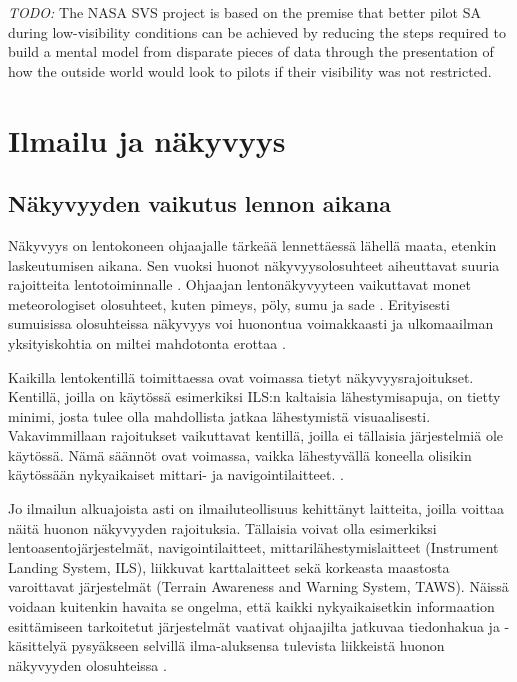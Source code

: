 \documentclass[utf8,bachelor,manualbib]{gradu3}
\begin{document}
\emph{TODO:}
The NASA SVS project is based on the premise that better pilot SA during
low-visibility conditions can be achieved by reducing the steps required to build a
mental model from disparate pieces of data through the presentation of how the
outside world would look to pilots if their visibility was not restricted. \citep{prinzel2004}

\chapter{Ilmailu ja näkyvyys}

\section{Näkyvyyden vaikutus lennon aikana}

Näkyvyys on lentokoneen ohjaajalle tärkeää lennettäessä lähellä maata, etenkin laskeutumisen aikana. Sen vuoksi huonot näkyvyysolosuhteet aiheuttavat suuria rajoitteita lentotoiminnalle \citep{mollersachs1994}. Ohjaajan lentonäkyvyyteen vaikuttavat monet meteorologiset olosuhteet, kuten pimeys, pöly, sumu ja sade \citep{wickens2009}. Erityisesti sumuisissa olosuhteissa näkyvyys voi huonontua voimakkaasti ja ulkomaailman yksityiskohtia on miltei mahdotonta erottaa \citep{beiergemperlein2004}.

Kaikilla lentokentillä toimittaessa ovat voimassa tietyt näkyvyysrajoitukset. Kentillä, joilla on käytössä esimerkiksi ILS:n kaltaisia lähestymisapuja, on tietty minimi, josta tulee olla mahdollista jatkaa lähestymistä visuaalisesti. Vakavimmillaan rajoitukset vaikuttavat kentillä, joilla ei tällaisia järjestelmiä ole käytössä. Nämä säännöt ovat voimassa, vaikka lähestyvällä koneella olisikin käytössään nykyaikaiset mittari- ja navigointilaitteet. \cite{mollersachs1994}.

Jo ilmailun alkuajoista asti on ilmailuteollisuus kehittänyt laitteita, joilla voittaa näitä huonon näkyvyyden rajoituksia. Tällaisia voivat olla esimerkiksi lentoasentojärjestelmät, navigointilaitteet, mittarilähestymislaitteet (Instrument Landing System, ILS), liikkuvat karttalaitteet sekä korkeasta maastosta varoittavat järjestelmät (Terrain Awareness and Warning System, TAWS). Näissä voidaan kuitenkin havaita se ongelma, että kaikki nykyaikaisetkin informaation esittämiseen tarkoitetut järjestelmät vaativat ohjaajilta jatkuvaa tiedonhakua ja -käsittelyä pysyäkseen selvillä ilma-aluksensa tulevista liikkeistä huonon näkyvyyden olosuhteissa \citep {prinzel2004}.
\end{document}
